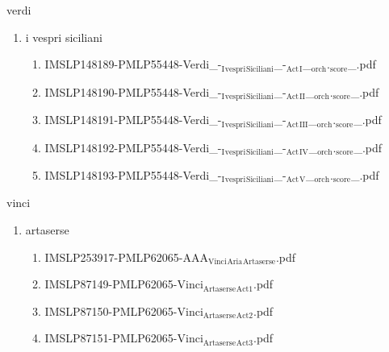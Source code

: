 \documentclass[11pt]{article}
\begin{document}
\item verdi
\label{sec-1-1-1-1-44-70}
\begin{enumerate}
\item i vespri siciliani
\label{sec-1-1-1-1-44-70-1}
\begin{enumerate}
\item IMSLP148189-PMLP55448-Verdi\_-$_{\text{I}}$$_{\text{vespri}}$$_{\text{Siciliani}}$\_-$_{\text{Act}}$$_{\text{I}}$\_$_{\text{orch}}$.$_{\text{score}}$\_.pdf
\label{sec-1-1-1-1-44-70-1-1}

\item IMSLP148190-PMLP55448-Verdi\_-$_{\text{I}}$$_{\text{vespri}}$$_{\text{Siciliani}}$\_-$_{\text{Act}}$$_{\text{II}}$\_$_{\text{orch}}$.$_{\text{score}}$\_.pdf
\label{sec-1-1-1-1-44-70-1-2}

\item IMSLP148191-PMLP55448-Verdi\_-$_{\text{I}}$$_{\text{vespri}}$$_{\text{Siciliani}}$\_-$_{\text{Act}}$$_{\text{III}}$\_$_{\text{orch}}$.$_{\text{score}}$\_.pdf
\label{sec-1-1-1-1-44-70-1-3}

\item IMSLP148192-PMLP55448-Verdi\_-$_{\text{I}}$$_{\text{vespri}}$$_{\text{Siciliani}}$\_-$_{\text{Act}}$$_{\text{IV}}$\_$_{\text{orch}}$.$_{\text{score}}$\_.pdf
\label{sec-1-1-1-1-44-70-1-4}

\item IMSLP148193-PMLP55448-Verdi\_-$_{\text{I}}$$_{\text{vespri}}$$_{\text{Siciliani}}$\_-$_{\text{Act}}$$_{\text{V}}$\_$_{\text{orch}}$.$_{\text{score}}$\_.pdf
\label{sec-1-1-1-1-44-70-1-5}
\end{enumerate}
\end{enumerate}

\item vinci
\label{sec-1-1-1-1-44-71}
\begin{enumerate}
\item artaserse
\label{sec-1-1-1-1-44-71-1}
\begin{enumerate}
\item IMSLP253917-PMLP62065-AAA$_{\text{Vinci}}$$_{\text{Aria}}$$_{\text{Artaserse}}$.pdf
\label{sec-1-1-1-1-44-71-1-1}

\item IMSLP87149-PMLP62065-Vinci$_{\text{Artaserse}}$$_{\text{Act1}}$.pdf
\label{sec-1-1-1-1-44-71-1-2}

\item IMSLP87150-PMLP62065-Vinci$_{\text{Artaserse}}$$_{\text{Act2}}$.pdf
\label{sec-1-1-1-1-44-71-1-3}

\item IMSLP87151-PMLP62065-Vinci$_{\text{Artaserse}}$$_{\text{Act3}}$.pdf
\label{sec-1-1-1-1-44-71-1-4}
\end{enumerate}
\end{enumerate}
\end{document}
